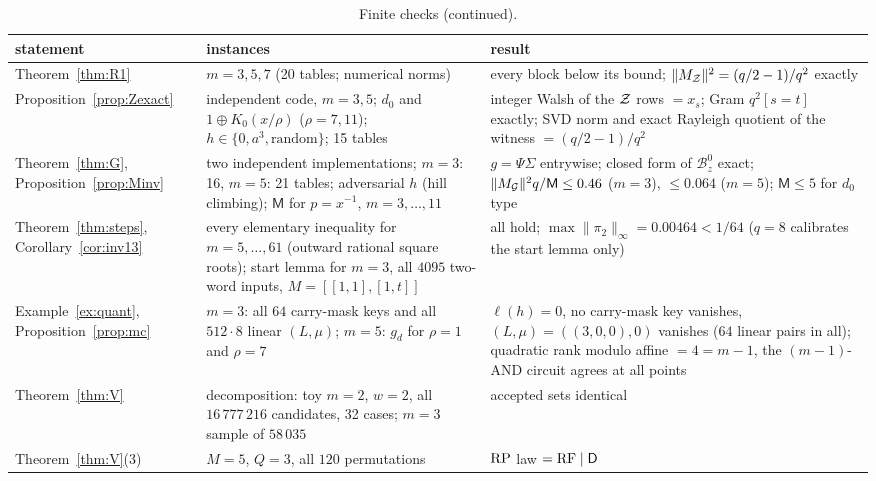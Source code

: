 \begin{table}[p]\footnotesize
\caption{Finite checks (continued).}\label{tab:finite2}
\begin{tabular}{p{}p{}p{}}
\toprule
statement & instances & result\\
\midrule
Theorem~\ref{thm:R1} & $m=3,5,7$ (20 tables; numerical norms) & every block below its bound; $\|M_{\mathcal{Z}}\|^2=(q/2-1)/q^2$ exactly\\
Proposition~\ref{prop:Zexact} & independent code, $m=3,5$; $d_0$ and $1\oplus K_0(x/\rho)$ ($\rho=7,11$); $h\in\{0,a^3,\text{random}\}$; 15 tables & integer Walsh of the $\mathcal{Z}$ rows $=x_s$; Gram $q^2[s=t]$ exactly; SVD norm and exact Rayleigh quotient of the witness $=(q/2-1)/q^2$\\
Theorem~\ref{thm:G}, Proposition~\ref{prop:Minv} & two independent implementations; $m=3$: 16, $m=5$: 21 tables; adversarial $h$ (hill climbing); $\mathsf M$ for $p=x^{-1}$, $m=3,\dots,11$ & $g=\Psi\Sigma$ entrywise; closed form of $\mathcal B^0_z$ exact; $\|M_{\mathcal{G}}\|^2q/\mathsf M\le0.46$ ($m=3$), $\le0.064$ ($m=5$); $\mathsf M\le5$ for $d_0$ type\\
Theorem~\ref{thm:steps}, Corollary~\ref{cor:inv13} & every elementary inequality for $m=5,\dots,61$ (outward rational square roots); start lemma for $m=3$, all $4095$ two-word inputs, $M=[[1,1],[1,t]]$ & all hold; $\max\|\pi_2\|_\infty=0.00464<1/64$ ($q=8$ calibrates the start lemma only)\\
Example~\ref{ex:quant}, Proposition~\ref{prop:mc} & $m=3$: all $64$ carry-mask keys and all $512\cdot8$ linear $(L,\mu)$; $m=5$: $g_d$ for $\rho=1$ and $\rho=7$ & $\ell(h)=0$, no carry-mask key vanishes, $(L,\mu)=((3,0,0),0)$ vanishes ($64$ linear pairs in all); quadratic rank modulo affine $=4=m-1$, the $(m-1)$-AND circuit agrees at all points\\
Theorem~\ref{thm:V} & decomposition: toy $m=2$, $w=2$, all $16\,777\,216$ candidates, 32 cases; $m=3$ sample of $58\,035$ & accepted sets identical\\
Theorem~\ref{thm:V}(3) & $M=5$, $Q=3$, all $120$ permutations & $\mathrm{RP}$ law $=\mathrm{RF}\mid\mathsf D$\\
\bottomrule
\end{tabular}
\end{table}

